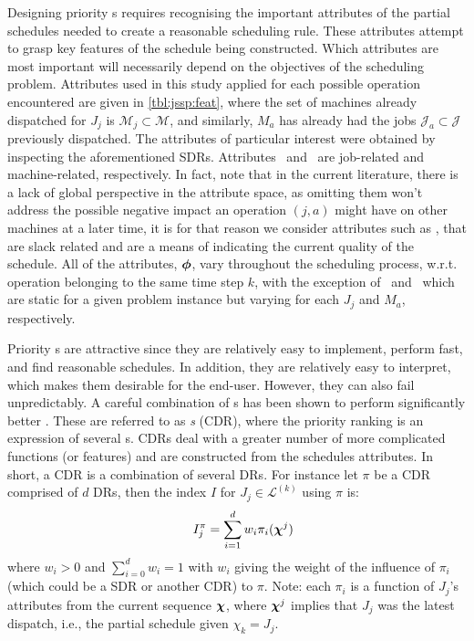 \documentclass[twocolumn]{svjour3}
\begin{document}
Designing priority \dr s requires recognising the important attributes of the 
partial schedules needed to create a reasonable scheduling rule. 
These attributes attempt to grasp key features of the schedule being 
constructed. Which attributes are most important will necessarily depend on the
objectives of the scheduling problem. 
Attributes used in this study applied for each possible operation encountered 
are given in \cref{tbl:jssp:feat}, where the set of machines already dispatched 
for $J_j$ is $\mathcal{M}_j\subset\mathcal{M}$, and similarly, $M_a$ has 
already had the jobs $\mathcal{J}_a\subset\mathcal{J}$ previously dispatched.
The attributes of particular interest were obtained by inspecting the 
aforementioned SDRs. Attributes \phiJobRelated\ and \phiMacRelated\ are 
job-related and machine-related, respectively.
In fact, \cite{Pickardt2013} note that in the current literature, there is a 
lack of global perspective in the attribute space, as omitting them won't 
address the possible negative impact an operation $(j,a)$ might have on other 
machines at a later time, it is for that reason we consider attributes such as 
\phiSlackRelated, that are slack related and are a means of indicating the 
current quality of the schedule.
All of the attributes, $\bm{\phi}$, vary throughout the scheduling process, 
w.r.t. operation belonging to the same time step $k$, with the exception of 
\phijobTotProcTime\ and \phimacTotProcTime\ which are static for a given 
problem instance but varying for each $J_j$ and $M_a$, respectively. 

Priority \dr s are attractive since they are relatively easy to 
implement, perform fast, and find reasonable schedules. In addition, they are 
relatively easy to interpret, which makes them desirable for the end-user.
However, they can also fail unpredictably. 
A careful combination of \dr s has been shown to perform significantly better 
\cite{Jayamohan04}. These are referred to as \emph{\cdr s} 
(CDR), where the priority ranking is an expression of several \dr s. 
CDRs deal with a greater number of more complicated functions (or features) and 
are constructed from the schedules attributes. In short, a CDR is a combination 
of several DRs. 
For instance let $\pi$ be a CDR comprised of $d$ DRs, then the index $I$ for 
$J_j\in\mathcal{L}^{(k)}$ using $\pi$ is:
\begin{equation}\quad I_j^{\pi} = \sum_{i=1}^d w_i \pi_i(\bm \chi^j) 
\label{eq:CDR}
\end{equation}
where $w_i>0$ and $\sum_{i=0}^d w_i = 1$ with $w_i$ giving the weight of the 
influence of $\pi_i$ (which could be a SDR or another CDR) to $\pi$. Note: 
each $\pi_i$ is a function of $J_j$'s attributes from the current sequence 
$\bm \chi$, where $\bm \chi^j$ implies that $J_j$ was the latest dispatch, i.e., the 
partial schedule given $\chi_k=J_j$.
\end{document}
